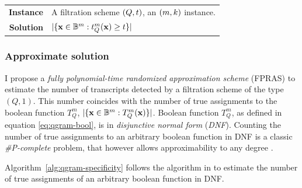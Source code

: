 \begin{problem}
\begin{tabular}{rl}
{\bf Instance}	&	A filtration scheme $(Q,t)$, an $(m,k)$ instance.\\
{\bf Solution}	&	$| \{ \mathbf{x} \in \mathbb {B}^{m} : t_{Q}^{m}(\mathbf{x}) \geq t \} |$
\end{tabular}
\end{problem}

\subsubsection{Approximate solution}

I propose a \emph{fully polynomial-time randomized approximation scheme} (FPRAS) \citep{Vazirani2001} to estimate the number of transcripts detected by a filtration scheme of the type $(Q,1)$.
This number coincides with the number of true assignments to the boolean function $T_{Q}^{m}$, \ie $| \{ \mathbf{x} \in \mathbb {B}^{m} : T_{Q}^{m}(\mathbf{x}) \} |$.
Boolean function $T_{Q}^{m}$, as defined in equation \ref{eq:qgram-bool}, is in \emph{disjunctive normal form} (\emph{DNF}).
Counting the number of true assignments to an arbitrary boolean function in DNF is a classic \emph{\#P-complete} problem, that however allows approximability to any degree \citep{Vazirani2001}.

Algorithm~\ref{alg:qgram-specificity} follows the algorithm in \citep{Karp1989} to estimate the number of true assignments of an arbitrary boolean function in DNF.

